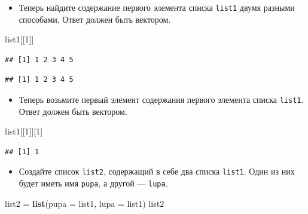 \documentclass[]{book}
\newenvironment{Shaded}{\begin{snugshade}}{\end{snugshade}}
\newcommand{\KeywordTok}[1]{\textcolor[rgb]{0.13,0.29,0.53}{\textbf{#1}}}
\newcommand{\DataTypeTok}[1]{\textcolor[rgb]{0.13,0.29,0.53}{#1}}
\newcommand{\DecValTok}[1]{\textcolor[rgb]{0.00,0.00,0.81}{#1}}
\newcommand{\StringTok}[1]{\textcolor[rgb]{0.31,0.60,0.02}{#1}}
\newcommand{\OperatorTok}[1]{\textcolor[rgb]{0.81,0.36,0.00}{\textbf{#1}}}
\newcommand{\NormalTok}[1]{#1}
\providecommand{\tightlist}{%
  \setlength{\itemsep}{0pt}\setlength{\parskip}{0pt}}
\begin{document}
\begin{itemize}
\tightlist
\item
  Теперь найдите содержание первого элемента списка \texttt{list1} двумя
  разными способами. Ответ должен быть вектором.
\end{itemize}

\begin{Shaded}
\begin{Highlighting}[]
\NormalTok{list1[[}\DecValTok{1}\NormalTok{]]}
\end{Highlighting}
\end{Shaded}

\begin{verbatim}
## [1] 1 2 3 4 5
\end{verbatim}

\begin{Shaded}
\end{Shaded}

\begin{verbatim}
## [1] 1 2 3 4 5
\end{verbatim}

\begin{itemize}
\tightlist
\item
  Теперь возьмите первый элемент содержания первого элемента списка
  \texttt{list1}. Ответ должен быть вектором.
\end{itemize}

\begin{Shaded}
\begin{Highlighting}[]
\NormalTok{list1[[}\DecValTok{1}\NormalTok{]][}\DecValTok{1}\NormalTok{]}
\end{Highlighting}
\end{Shaded}

\begin{verbatim}
## [1] 1
\end{verbatim}

\begin{itemize}
\tightlist
\item
  Создайте список \texttt{list2}, содержащий в себе два списка
  \texttt{list1}. Один из них будет иметь имя \texttt{pupa}, а другой
  --- \texttt{lupa}.
\end{itemize}

\begin{Shaded}
\begin{Highlighting}[]
\NormalTok{list2 =}\StringTok{ }\KeywordTok{list}\NormalTok{(}\DataTypeTok{pupa =}\NormalTok{ list1, }\DataTypeTok{lupa =}\NormalTok{ list1)}
\NormalTok{list2}
\end{Highlighting}
\end{Shaded}
\end{document}
